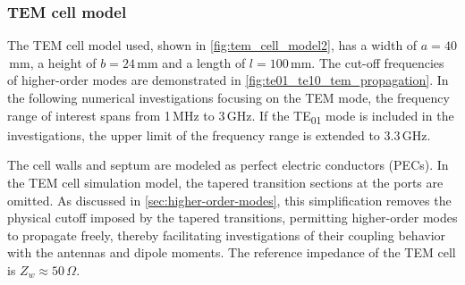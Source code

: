 %

\subsubsection{TEM cell model}\label{sec:tem_cell_model}

The TEM cell model used, shown in \autoref{fig:tem_cell_model2}, has a width of $a=40$\,mm, a height of $b=24$\,mm and a length of $l=100$\,mm. The cut-off frequencies of higher-order modes are demonstrated in \autoref{fig:te01_te10_tem_propagation}. In the following numerical investigations focusing on the TEM mode, the frequency range of interest spans from 1\,MHz to 3\,GHz. If the TE\textsubscript{01} mode is included in the investigations, the upper limit of the frequency range is extended to 3.3\,GHz.

The cell walls and septum are modeled as perfect electric conductors (PECs). In the TEM cell simulation model, the tapered transition sections at the ports are omitted. As discussed in \cref{sec:higher-order-modes}, this simplification removes the physical cutoff imposed by the tapered transitions, permitting higher-order modes to propagate freely, thereby facilitating investigations of their coupling behavior with the antennas and dipole moments. The reference impedance of the TEM cell is $Z_w \approx 50\,\Omega$.

%	

